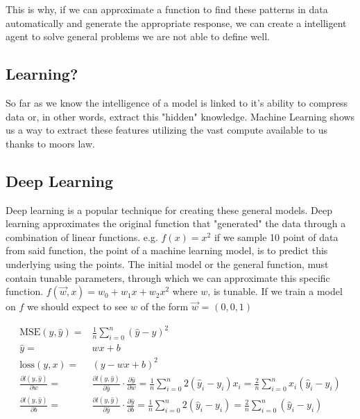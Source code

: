 \documentclass{article}
\begin{document}
This is why, if we can approximate a function to find these patterns in data automatically 
and generate the appropriate response, we can create a intelligent agent to solve general 
problems we are not able to define well.

\subsection{Learning?}

So far as we know the intelligence of a model is linked to it's ability to compress data 
or, in other words, extract this "hidden" knowledge. Machine Learning shows us a way to 
extract these features utilizing the vast compute available to us thanks to moors law. 

\subsection{Deep Learning}
Deep learning is a popular technique for creating these general models. Deep learning 
approximates the original function that "generated" the data through a combination of linear
functions. e.g. $f(x) = x^2$ if we sample 10 point of data from said function, the point of 
a machine learning model, is to predict this underlying using the points. The initial model
or the general function, must contain tunable parameters, through which we can approximate
this specific function. $f(\vec{w}, x) = w_0 + w_1x + w_2x^2$ where $w$, is tunable. 
If we train a model on $f$ we should expect to see $w$ of the form $\vec{w}$ = $(0, 0, 1)$

\begin{align*}
\text{MSE}(y, \hat{y}) =& \frac{1}{n}\sum_{i=0}^n{ (\hat{y} - y)^2 }\\ 
    \hat{y} =& wx+b \\
    \text{loss}(y, x) =& (y - wx+b)^2 \\
    \frac{\partial l(y, \hat{y})}{\partial w} =& \frac{\partial l(y, \hat{y}) }{\partial \hat{y}} \cdot \frac{\partial \hat{y}}{\partial w} = \frac{1}{n}\sum_{i=0}^n{ 2(\hat{y}_i-y_i)x_i } = \frac{2}{n}\sum_{i=0}^n{ x_i(\hat{y}_i-y_i) } \\
    \frac{\partial l(y, \hat{y})}{\partial b} =& \frac{\partial l(y, \hat{y}) }{\partial \hat{y}} \cdot \frac{\partial \hat{y}}{\partial b} = \frac{1}{n}\sum_{i=0}^n{  2(\hat{y}_i - y_i)}  = \frac{2}{n}\sum_{i=0}^n{  (\hat{y}_i - y_i) }
\end{align*}

\newpage
\end{document}
